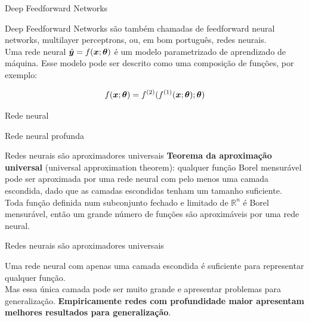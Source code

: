 \documentclass[10pt]{beamer}
\begin{document}
\begin{frame}{Deep Feedforward Networks}

\alert{Deep Feedforward Networks} são também chamadas de \alert{feedforward neural networks}, \alert{multilayer perceptrons}, ou, em bom português, \alert{redes neurais}.\\


Uma rede neural $\hat{\bm{y}} = f(\bm{x}; \bm{\theta})$ é um modelo parametrizado de aprendizado de máquina. Esse modelo pode ser descrito como uma composição de funções, por exemplo:

\begin{equation*}
f(\bm{x}; \bm{\theta}) = f^{(2)}(f^{(1)}(\bm{x}; \bm{\theta}); \bm{\theta})
\end{equation*}
\end{frame}

\begin{frame}{Rede neural}

\end{frame}

\begin{frame}{Rede neural profunda}

\end{frame}

\begin{frame}{Redes neurais são aproximadores universais}
\textbf{Teorema da aproximação universal} (\alert{universal approximation theorem}): qualquer função Borel mensurável pode ser aproximada por uma rede neural com pelo menos uma camada escondida, dado que as camadas escondidas tenham um tamanho suficiente.\\

Toda função definida num subconjunto fechado e limitado de $\mathbb{R}^{n}$ é Borel mensurável, então um grande número de funções são aproximáveis por uma rede neural.  
\end{frame}

\begin{frame}{Redes neurais são aproximadores universais}

Uma rede neural com apenas uma camada escondida é suficiente para representar qualquer função. \\

Mas essa única camada pode ser muito grande e apresentar problemas para generalização. \textbf{Empiricamente redes com profundidade maior apresentam melhores resultados para generalização}.
\end{frame}
\end{document}

